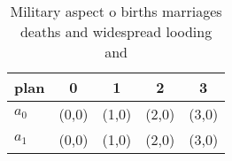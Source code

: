 \documentclass[a4paper]{article}
\begin{document}
\begin{table}
\begin{adjustbox}{width=0.5\columnwidth}
\begin{tabular}{|l|l|l|l|l|}
\hline
\textbf{plan} & \multicolumn{1}{c|}{\textbf{0}} & \multicolumn{1}{c|}{\textbf{1}} & \multicolumn{1}{c|}{\textbf{2}} & \multicolumn{1}{c|}{\textbf{3}} \\ \hline
\textbf{$a_0$}  & (0,0) & (1,0) & (2,0) & (3,0) \\ \hline
\textbf{$a_1$}  & (0,0) & (1,0) & (2,0) & (3,0) \\ \hline
\end{tabular}
\end{adjustbox}
\caption{Military aspect o births marriages deaths and widespread looding and 
}
\end{table}
\end{document}
